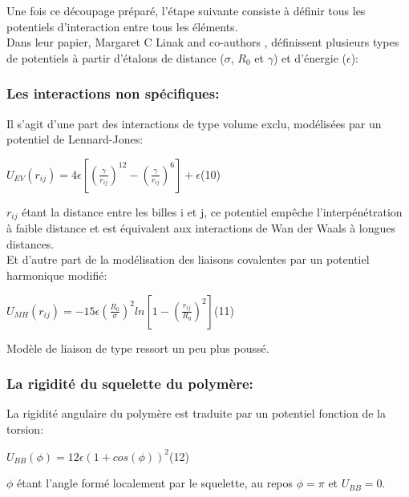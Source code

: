\documentclass[a4paper,11pt]{article}
\begin{document}
Une fois ce découpage préparé, l'étape suivante consiste à définir tous les potentiels d'interaction entre tous les éléments.\\

Dans leur papier, Margaret C Linak and co-authors \cite{jchem}, définissent plusieurs types de potentiels à partir d'étalons de distance ($\sigma$, $R_0$ et $\gamma$) et d'énergie ($\epsilon$):

\subsubsection*{Les interactions non spécifiques:}

Il s'agit d'une part des interactions de type volume exclu, modélisées par un potentiel de Lennard-Jones:

\begin{center}

$U_{EV}(r_{ij})= 4\epsilon [(\frac{\gamma}{r_{ij}})^{12}-(\frac{\gamma}{r_{ij}})^{6}] + \epsilon$\flushright(10)


\end{center}

$r_{ij}$ étant la distance entre les billes i et j, ce potentiel empêche l'interpénétration à faible distance et est équivalent aux interactions de Wan der Waals à longues distances.\\

Et d'autre part de la modélisation des liaisons covalentes par un potentiel harmonique modifié:
\begin{center}
$U_{MH}(r_{ij})= -15\epsilon (\frac{R_0}{\sigma})^2 ln[1-(\frac{r_{ij}}{R_0})^2]$\flushright(11)
\end{center}

Modèle de liaison de type ressort un peu plus poussé.


\subsubsection*{La rigidité du squelette du polymère:}

La rigidité angulaire du polymère est traduite par un potentiel fonction de la torsion:

\begin{center}
$U_{BB}(\phi)= 12\epsilon (1+cos(\phi))^2$\flushright(12)
\end{center}

$\phi$ étant l'angle formé localement par le squelette, au repos $\phi=\pi$ et $U_{BB}=0$.
\end{document}
